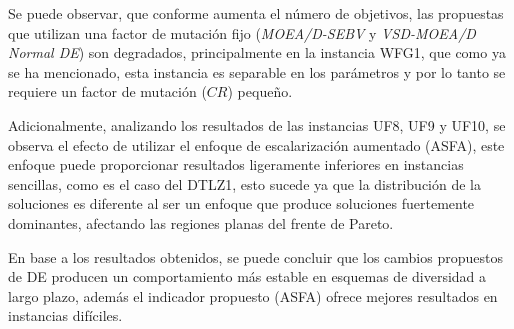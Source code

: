 Se puede observar, que conforme aumenta el número de objetivos, las propuestas que utilizan una factor de mutación fijo (\textit{MOEA/D-SEBV} y \textit{VSD-MOEA/D Normal DE}) son degradados, principalmente en la instancia WFG1, que como ya se ha mencionado, esta instancia es separable en los parámetros y por lo tanto se requiere un factor de mutación ($CR$) pequeño.

%
Adicionalmente, analizando los resultados de las instancias UF8, UF9 y UF10, se observa el efecto de utilizar el enfoque de escalarización aumentado (ASFA), este enfoque puede proporcionar resultados ligeramente inferiores en instancias sencillas, como es el caso del DTLZ1, esto sucede ya que la distribución de la soluciones es diferente al ser un enfoque que produce soluciones fuertemente dominantes, afectando las regiones planas del frente de Pareto.


En base a los resultados obtenidos, se puede concluir que los cambios propuestos de DE producen un comportamiento más estable en esquemas de diversidad a largo plazo, además el indicador propuesto (ASFA) ofrece mejores resultados en instancias difíciles.

